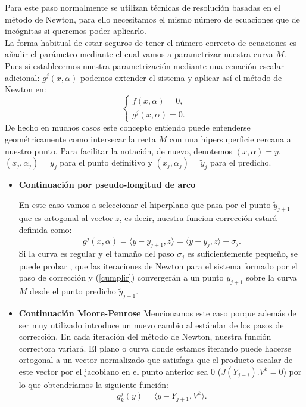  Para este paso normalmente se utilizan técnicas de resolución basadas en el método de Newton, para ello necesitamos el mismo número de ecuaciones que de incógnitas si queremos poder aplicarlo.\\
 La forma habitual de estar seguros de tener el número correcto de ecuaciones es añadir el parámetro mediante el cual vamos a parametrizar nuestra curva $M$. Pues si establecemos nuestra parametrización mediante una ecuación escalar adicional: $g^j(x,\alpha)$ podemos extender el sistema y aplicar así el método de Newton en:
 \[\left\lbrace  \begin{array}{ccc}
 f(x,\alpha)=0,  \\
 g^j(x,\alpha)=0.
 \end{array} \right.
 \]
  De hecho en muchos casos este concepto entiendo puede entenderse geométricamente como intersecar la recta $M$ con una hipersuperficie cercana a nuestro punto. Para facilitar la notación, de nuevo, denotemos $(x,\alpha)=y$, $(x_j,\alpha_j)=y_j$ para el punto definitivo y $(x_j,\alpha_j)=\tilde{y}_j$ para el predicho.
 \begin{itemize}
 	\item \textbf{Continuación por pseudo-longitud de arco }
 	
 	En este caso vamos a seleccionar el hiperplano que pasa por el punto $\tilde{y}_{j+1}$ que es ortogonal al vector $z$, es decir, nuestra funcion corrección estará definida como:
 	\begin{equation}
	g^j(x,\alpha) =\langle y-\tilde{y}_{j+1},z\rangle =\langle y-y_{j},z\rangle-\sigma_j.
	\label{pseudoarco}
 	\end{equation}
 	Si la curva es regular y el tamaño del paso $\sigma_j$ es suficientemente pequeño, se puede probar \cite{Keller}, que las iteraciones de Newton para el sistema formado por el paso de corrección y (\ref{cumplir})  convergerán a un punto $y_{j+1}$ sobre la curva $M$ desde el punto predicho $\tilde{y}_{j+1}$.
 	
 	\item \textbf{Continuación Moore-Penrose} 
 	Mencionamos este caso porque además de ser muy utilizado \cite{allgower} introduce un nuevo cambio al estándar de los pasos de corrección. En cada iteración del método de Newton, nuestra función correctora variará. El plano o curva donde estamos iterando puede hacerse ortogonal a un vector normalizado que satisfaga que el producto escalar de este vector por el jacobiano en el punto anterior sea 0 ($J(Y_{j-i}).V^k=0$) por lo que obtendríamos la siguiente función: 
 		\begin{equation}
 		g^j_k(y) =\langle y-Y_{j + 1},V^k\rangle .
 		\label{moore}
 		\end{equation}
 \end{itemize}

